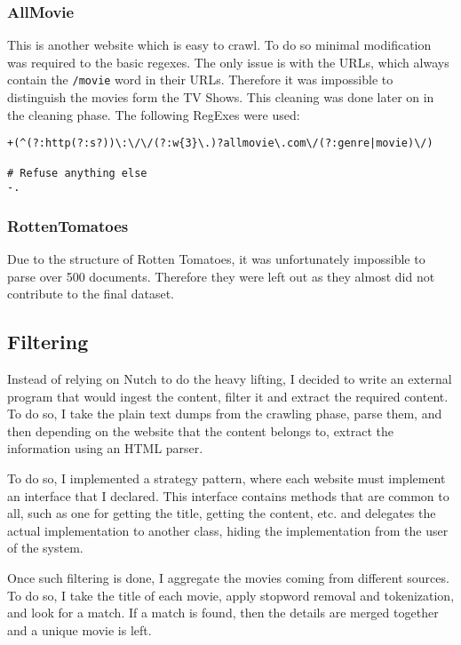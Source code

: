 \documentclass[a4paper]{article}
\begin{document}
\subsubsection{AllMovie}
This is another website which is easy to crawl. To do so minimal modification was required to the basic regexes. The only issue is with the URLs, which always contain the \texttt{/movie} word in their URLs. Therefore it was impossible to distinguish the movies form the TV Shows. This cleaning was done later on in the cleaning phase. The following RegExes were used:
\begin{verbatim}
+(^(?:http(?:s?))\:\/\/(?:w{3}\.)?allmovie\.com\/(?:genre|movie)\/)

# Refuse anything else
-.
\end{verbatim}

\subsubsection{RottenTomatoes}
Due to the structure of Rotten Tomatoes, it was unfortunately impossible to parse over 500 documents. Therefore they were left out as they almost did not contribute to the final dataset.

\subsection{Filtering}
Instead of relying on Nutch to do the heavy lifting, I decided to write an external program that would ingest the content, filter it and extract the required content. To do so, I take the plain text dumps from the crawling phase, parse them, and then depending on the website that the content belongs to, extract the information using an HTML parser.

To do so, I implemented a strategy pattern, where each website must implement an interface that I declared. This interface contains methods that are common to all, such as one for getting the title, getting the content, etc. and delegates the actual implementation to another class, hiding the implementation from the user of the system. 

Once such filtering is done, I aggregate the movies coming from different sources. To do so, I take the title of each movie, apply stopword removal and tokenization, and look for a match. If a match is found, then the details are merged together and a unique movie is left.
\end{document}
